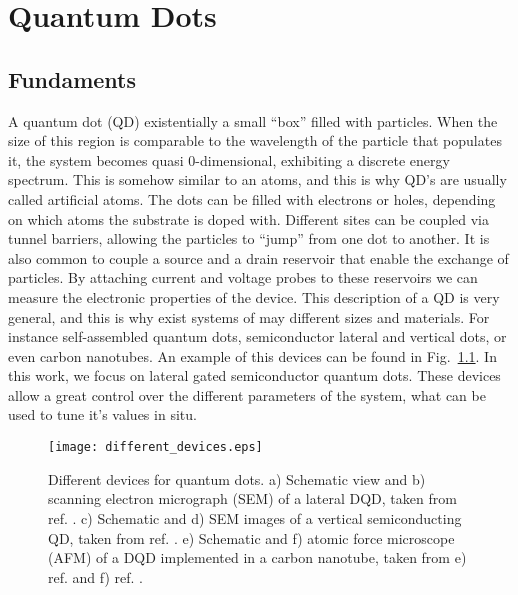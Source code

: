 
\chapter{Quantum Dots} %

\label{sec:Quantum_Dots} %


\section{Fundaments}

A quantum dot (QD) existentially a small ``box'' filled with particles. When the size of this region is comparable to the wavelength of the particle that populates it, the system becomes quasi 0-dimensional, exhibiting a discrete energy spectrum. This is somehow similar to an atoms, and this is why QD's are usually called artificial atoms. The dots can be filled with electrons or holes, depending on which atoms the substrate is doped with. Different sites can be coupled via tunnel barriers, allowing the particles to ``jump'' from one dot to another. It is also common to couple a source and a drain reservoir that enable the exchange of particles. By attaching current and voltage probes to these reservoirs we can measure the electronic properties of the device. This description of a QD is very general, and this is why exist systems of may different sizes and materials. For instance self-assembled quantum dots, semiconductor lateral and vertical dots, or even carbon nanotubes. An example of this devices can be found in Fig.~\ref{fig:different_devices}. In this work, we focus on lateral gated semiconductor quantum dots. These devices allow a great control over the different parameters of the system, what can be used to tune it's values in situ. 
\begin{figure}[!htbp]
	\centering
	\texttt{[image: different\_devices.eps]}
	\caption{Different devices for quantum dots. a) Schematic view and b) scanning electron micrograph (SEM) of a lateral DQD, taken from ref. \cite{Hanson2007}. c) Schematic and d) SEM images of a vertical semiconducting QD, taken from ref. \cite{Kouwenhoven2001}. e) Schematic and f) atomic force microscope (AFM) of a DQD implemented in a carbon nanotube, taken from e) ref. \cite{SapmazPhd} and f) ref. \cite{Sapmaz2006}.}
	\label{fig:different_devices}
\end{figure}


